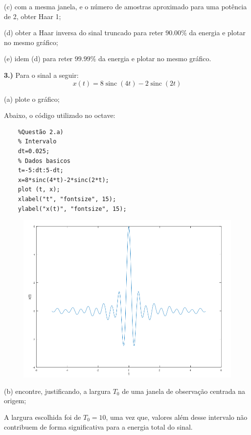 \documentclass[10pt]{article}
\DeclareMathOperator{\sinc}{sinc}
\begin{document}
(c) com a mesma janela, e o número de amostras aproximado para uma potência de 2, obter Haar 1;

(d) obter a Haar inversa do sinal truncado para reter $90.00\%$ da energia e plotar no mesmo gráfico;

(e) idem (d) para reter $99.99\%$ da energia e plotar no mesmo gráfico.


\vspace{\baselineskip}


\textbf{3.)} Para o sinal a seguir:
\[x(t) = 8\sinc(4t) - 2\sinc(2t)\]

(a) plote o gráfico;

Abaixo, o código utilizado no octave:

\begin{verbatim}
    %Questão 2.a)
    % Intervalo
    dt=0.025;
    % Dados basicos
    t=-5:dt:5-dt;
    x=8*sinc(4*t)-2*sinc(2*t);
    plot (t, x);
    xlabel("t", "fontsize", 15);
    ylabel("x(t)", "fontsize", 15);
\end{verbatim}

\begin{figure}[h]
    \includegraphics[scale=0.65]{questao3a}
    \centering
\end{figure}

(b) encontre, justificando, a largura $T_0$ de uma janela de observação centrada na origem;

A largura escolhida foi de $T_0 = 10$, uma vez que, valores além desse intervalo
não contribuem de forma significativa para a energia total do sinal.
\vspace{\baselineskip}
\end{document}
